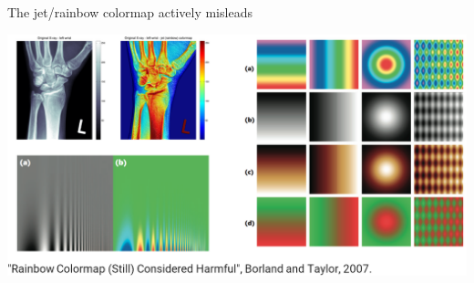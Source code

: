\documentclass[aspectratio=169]{../latex_main/tntbeamer}  %
\begin{document}
	
	
	\begin{frame}{The jet/rainbow colormap actively misleads}

	        \centering
	        \includegraphics[scale=.35]{Bild62}

	\end{frame}
	
\end{document}

